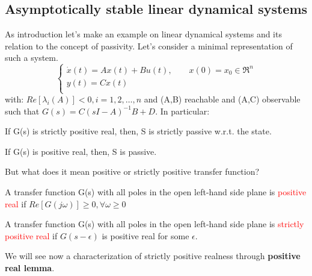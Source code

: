\subsection{Asymptotically stable linear dynamical systems}
As introduction let's make an example on linear dynamical systems and its relation to the concept of passivity. Let's consider a minimal representation of such a system.
\[\begin{cases} 
	\dot{x}(t)=Ax(t)+Bu(t),\qquad x(0)=x_0\in\Re^n\\
	y(t)=Cx(t)\\
\end{cases}
\] with: $Re[\lambda_i(A)]<0, i=1,2,\dots,n$ and (A,B) reachable and (A,C) observable such that $G(s)=C(sI-A)^{-1}B+D$. In particular:
\begin{prop}
	If G(s) is strictly positive real, then, S is strictly passive w.r.t. the state.
\end{prop}
\begin{prop}
	If G(s) is positive real, then, S is passive.
\end{prop}
But what does it mean positive or strictly positive transfer function?
\begin{defn} 
	A transfer function G(s) with all poles in the open left-hand side plane is \textcolor{red}{positive real} if $Re[G(j\omega)] \ge0, \forall  \omega \ge 0$
\end{defn}
\begin{defn} 
	A transfer function G(s) with all poles in the open left-hand side plane is \textcolor{red}{strictly positive real} if $G(s-\epsilon)$ is positive real for some $\epsilon$.
\end{defn}
We will see now a characterization of strictly positive realness through \textbf{positive real lemma}.
